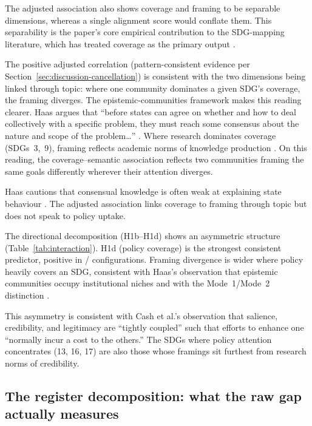 \documentclass[12pt,a4paper]{article}
\begin{document}
 The adjusted association also shows coverage and framing to be separable dimensions, whereas a single alignment score would conflate them. This separability is the paper's core empirical contribution to the SDG-mapping literature, which has treated coverage as the primary output \parencite{Armitage2020, Kashnitsky2024}.

 The positive adjusted correlation (pattern-consistent evidence per Section~\ref{sec:discussion-cancellation}) is consistent with the two dimensions being linked through topic: where one community dominates a given SDG's coverage, the framing diverges. The epistemic-communities framework \parencite{Haas1992} makes this reading clearer. Haas argues that ``before states can agree on whether and how to deal collectively with a specific problem, they must reach some consensus about the nature and scope of the problem\ldots'' \parencite[29]{Haas1992}. Where research dominates coverage (SDGs~3,~9), framing reflects academic norms of knowledge production \parencite[3]{Gibbons1994}. On this reading, the coverage--semantic association reflects two communities framing the same goals differently wherever their attention diverges.

Haas cautions that consensual knowledge is often weak at explaining state behaviour \parencite[30]{Haas1992}. The adjusted association links coverage to framing through topic but does not speak to policy uptake.

The directional decomposition (H1b--H1d) shows an asymmetric structure (Table~\ref{tab:interaction}). H1d (policy coverage) is the strongest consistent predictor, positive in \HOneDPolicyAdjPositiveCount/\HOneDPolicyAdjPositiveCountTotal{} configurations. Framing divergence is wider where policy heavily covers an SDG, consistent with Haas's observation that epistemic communities occupy institutional niches \parencite[30]{Haas1992} and with the Mode~1/Mode~2 distinction \parencite{Gibbons1994}.

This asymmetry is consistent with Cash et al.'s \parencite{Cash2003} observation that salience, credibility, and legitimacy are ``tightly coupled'' such that efforts to enhance one ``normally incur a cost to the others.'' The SDGs where policy attention concentrates (13, 16, 17) are also those whose framings sit furthest from research norms of credibility.

\subsection{The register decomposition: what the raw gap actually measures}
\end{document}
